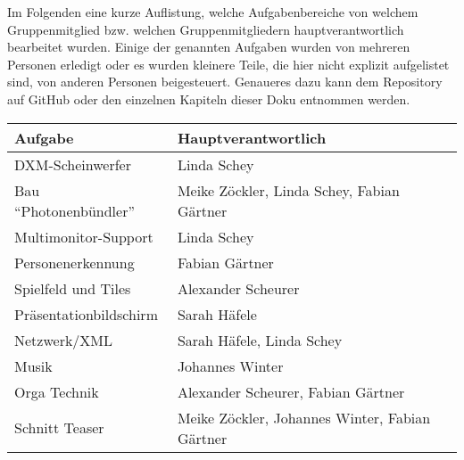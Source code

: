 
Im Folgenden eine kurze Auflistung, welche Aufgabenbereiche von welchem Gruppenmitglied bzw. welchen Gruppenmitgliedern hauptverantwortlich bearbeitet wurden. Einige der genannten Aufgaben wurden von mehreren Personen erledigt oder es wurden kleinere Teile, die hier nicht explizit aufgelistet sind, von anderen Personen beigesteuert. Genaueres dazu kann dem Repository auf GitHub oder den einzelnen Kapiteln dieser Doku entnommen werden.

\begin{center}
\begin{tabular}[hc]{|l|l|}
\hline
\textbf{Aufgabe} & \textbf{Hauptverantwortlich}\\
\hline
DXM-Scheinwerfer&Linda Schey\\
Bau \enquote{Photonenbündler}&Meike Zöckler, Linda Schey, Fabian Gärtner\\
Multimonitor-Support& Linda Schey\\
Personenerkennung& Fabian Gärtner\\
Spielfeld und Tiles& Alexander Scheurer\\
Präsentationbildschirm& Sarah Häfele\\
Netzwerk/XML& Sarah Häfele, Linda Schey\\
Musik&Johannes Winter\\
Orga Technik& Alexander Scheurer, Fabian Gärtner\\
Schnitt Teaser& Meike Zöckler, Johannes Winter, Fabian Gärtner\\
\hline
\end{tabular}
\end{center}